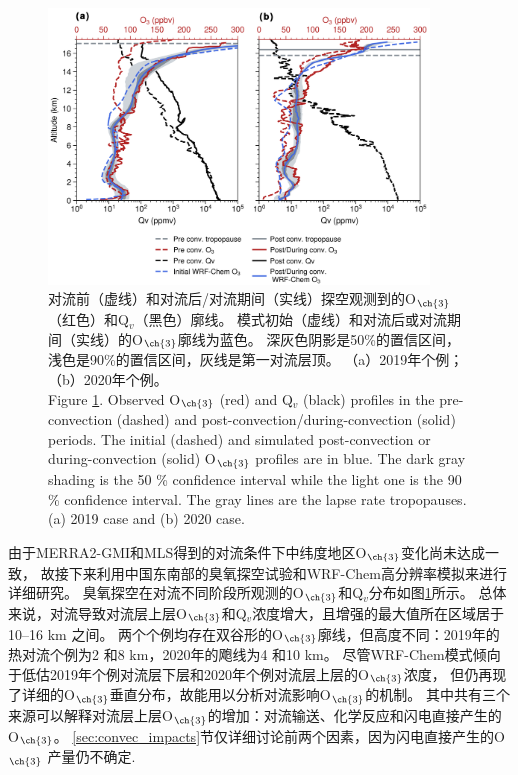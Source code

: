 \begin{figure}[H]
\centering
\includegraphics[width=0.9\textwidth]{./figures/ozonesonde_profile.png}
\caption{对流前（虚线）和对流后/对流期间（实线）探空观测到的O$_{\ch{3}}$（红色）和Q$_v$（黑色）廓线。
模式初始（虚线）和对流后或对流期间（实线）的O$_{\ch{3}}$廓线为蓝色。
深灰色阴影是50\%的置信区间，浅色是90\%的置信区间，灰线是第一对流层顶。
（a）2019年个例；（b）2020年个例。\\
Figure \ref{fig:ozonesonde_profile}. Observed O$_{\ch{3}}$ (red) and Q$_v$ (black) profiles in the pre-convection (dashed) and post-convection/during-convection (solid) periods.
The initial (dashed) and simulated post-convection or during-convection (solid) O$_{\ch{3}}$ profiles are in blue.
The dark gray shading is the 50 \% confidence interval while the light one is the 90 \% confidence interval.
The gray lines are the lapse rate tropopauses.
(a) 2019 case and (b) 2020 case.
}
\label{fig:ozonesonde_profile}
\end{figure}

由于MERRA2-GMI和MLS得到的对流条件下中纬度地区O$_{\ch{3}}$变化尚未达成一致，
故接下来利用中国东南部的臭氧探空试验和WRF-Chem高分辨率模拟来进行详细研究。
臭氧探空在对流不同阶段所观测的O$_{\ch{3}}$和Q$_v$分布如图\ref{fig:ozonesonde_profile}所示。
总体来说，对流导致对流层上层O$_{\ch{3}}$和Q$_v$浓度增大，且增强的最大值所在区域居于10--16 km 之间。
两个个例均存在双谷形的O$_{\ch{3}}$廓线，但高度不同：2019年的热对流个例为2 和8 km，2020年的飑线为4 和10 km。
尽管WRF-Chem模式倾向于低估2019年个例对流层下层和2020年个例对流层上层的O$_{\ch{3}}$浓度，
但仍再现了详细的O$_{\ch{3}}$垂直分布，故能用以分析对流影响O$_{\ch{3}}$的机制。
其中共有三个来源可以解释对流层上层O$_{\ch{3}}$的增加：对流输送、化学反应和闪电直接产生的O$_{\ch{3}}$。
\ref{sec:convec_impacts}节仅详细讨论前两个因素，因为闪电直接产生的O$_{\ch{3}}$
产量仍不确定\citep{Morris.2010,Ripoll.2014}.

